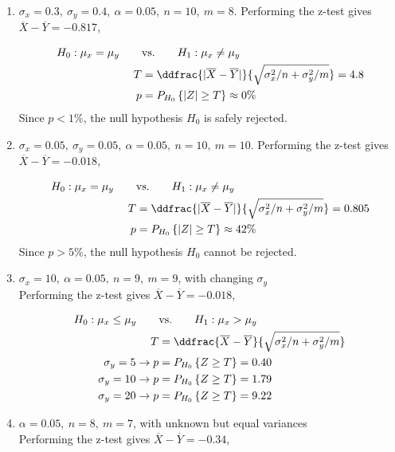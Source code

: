 \begin{enumerate}
	\item $ \sigma_x = 0.3,\ \sigma_y = 0.4,\ \alpha = 0.05,\ n = 10,\ m = 8$.
	Performing the z-test gives $ \overline{X} - \overline{Y} = -0.817 $,
	
	\begin{align}
		H_0 : \mu_x = \mu_y \qquad &\text{vs.} \qquad H_1 : \mu_x \neq \mu_y \nonumber \\
		T &= \ddfrac{| \overline{X} - \overline{Y} |}{\sqrt{\sigma_x^2/n + \sigma_y^2/m}} = 4.8 \nonumber \\
		p &= P_{H_0}\left\{|Z| \geq T\right\} \approx 0 \% 
	\end{align}
	Since $ p < 1\% $, the null hypothesis $ H_0 $ is safely rejected.
	
	\item $ \sigma_x = 0.05,\ \sigma_y = 0.05,\ \alpha = 0.05,\ n = 10,\ m = 10$.
	Performing the z-test gives $ \overline{X} - \overline{Y} = -0.018 $,
	
	\begin{align}
		H_0 : \mu_x = \mu_y \qquad &\text{vs.} \qquad H_1 : \mu_x \neq \mu_y \nonumber \\
		T &= \ddfrac{| \overline{X} - \overline{Y} |}{\sqrt{\sigma_x^2/n + \sigma_y^2/m}} = 0.805 \nonumber \\
		p &= P_{H_0}\left\{|Z| \geq T\right\} \approx 42 \% 
	\end{align}
	Since $ p > 5\% $, the null hypothesis $ H_0 $ cannot be rejected.
	
	\item $ \sigma_x = 10,\ \alpha = 0.05,\ n = 9,\ m = 9$, with changing $ \sigma_y $\\
	Performing the z-test gives $ \overline{X} - \overline{Y} = -0.018 $,
	
	\begin{align}
		H_0 : \mu_x \leq \mu_y \qquad &\text{vs.} \qquad H_1 : \mu_x > \mu_y \nonumber \\
		T &= \ddfrac{ \overline{X} - \overline{Y} }{\sqrt{\sigma_x^2/n + \sigma_y^2/m}} \nonumber \\
		\sigma_y = 5 \to p &= P_{H_0}\left\{Z \geq T\right\} = 0.40 \nonumber \\ 
		\sigma_y = 10 \to p &= P_{H_0}\left\{Z \geq T\right\} = 1.79 \nonumber \\
		\sigma_y = 20 \to p &= P_{H_0}\left\{Z \geq T\right\} = 9.22 
	\end{align}
	
	\item $\alpha = 0.05,\ n = 8,\ m = 7$, with unknown but equal variances\\
	Performing the z-test gives $ \overline{X} - \overline{Y} = -0.34 $,
	

\end{enumerate}
